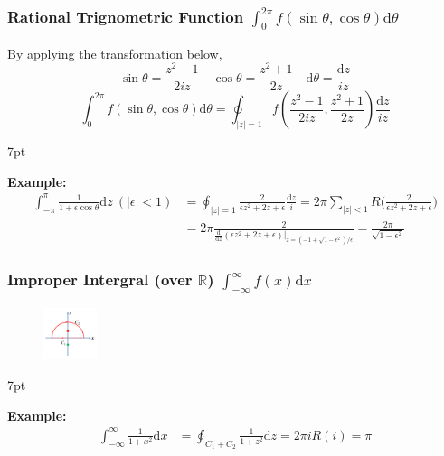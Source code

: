 \documentclass[10pt]{article}
\newcommand{\dd}{\mathrm{d}}
\newenvironment{formal}[2]{%
	\def\FrameCommand{%
		\hspace{1pt}%
		{\color{#1}\vrule width 2pt}%
		{\color{#2}\vrule width 4pt}%
		\colorbox{#2}%
	}%
	\MakeFramed{\advance\hsize-\width\FrameRestore}%
	\noindent\hspace{-4.55pt}%
	\begin{adjustwidth}{}{7pt}%
		\vspace{2pt}\vspace{2pt}%
	}
	{%
		\vspace{2pt}\end{adjustwidth}\endMakeFramed%
}
\begin{document}
\subsubsection[Rational Trignometric Function]{Rational Trignometric Function $\int_{0}^{2\pi} f(\sin \theta, \cos \theta) \dd \theta$}
By applying the transformation below,
$$
\sin \theta = \frac{z^2-1}{2iz} \quad \cos \theta = \frac{z^2+1}{2z} \quad \dd \theta = \frac{\dd z}{iz}
$$
$$
\int_{0}^{2\pi} f(\sin \theta, \cos \theta) \dd \theta = \oint_{|z|=1} f(\frac{z^2-1}{2iz}, \frac{z^2+1}{2z}) \frac{\dd z}{iz}
$$
\begin{formal}{Brown}{brownshade}
	
	\textbf{Example:}
	$$
	\begin{aligned}
		\int_{-\pi}^{\pi} \frac{1}{1+\epsilon \cos \theta} \dd z\ (|\epsilon|<1) &= \oint_{|z|=1} \frac{2}{\epsilon z^2+2z+\epsilon} \frac{\dd z}{i} = 2\pi\sum_{|z|<1} R\bigg(\frac{2}{\epsilon z^2+2z+\epsilon}\bigg)\\
		&= 2\pi \frac{2}{\frac{\dd}{\dd z}(\epsilon z^2+2z+\epsilon) \big|_{z=(-1+\sqrt{1-\epsilon^2})/\epsilon}} = \frac{2\pi}{\sqrt{1-\epsilon^2}}
	\end{aligned}
	$$
	
\end{formal}

\subsubsection[Improper Intergral]{Improper Intergral (over $\mathbb{R}$) $\int_{-\infty}^{\infty} f(x) \dd x$}


\begin{figure}[h]
	\centering
	\includegraphics[width=0.14\textwidth]{img3-4}
\end{figure}
\begin{formal}{Brown}{brownshade}
	
	\textbf{Example:}
	$$
	\begin{aligned}
		\int_{-\infty}^{\infty} \frac{1}{1+x^2} \dd x &= \oint_{C_1+C_2} \frac{1}{1+z^2} \dd z = 2\pi i R(i) = \pi
	\end{aligned}
	$$
	
\end{formal}
\end{document}

